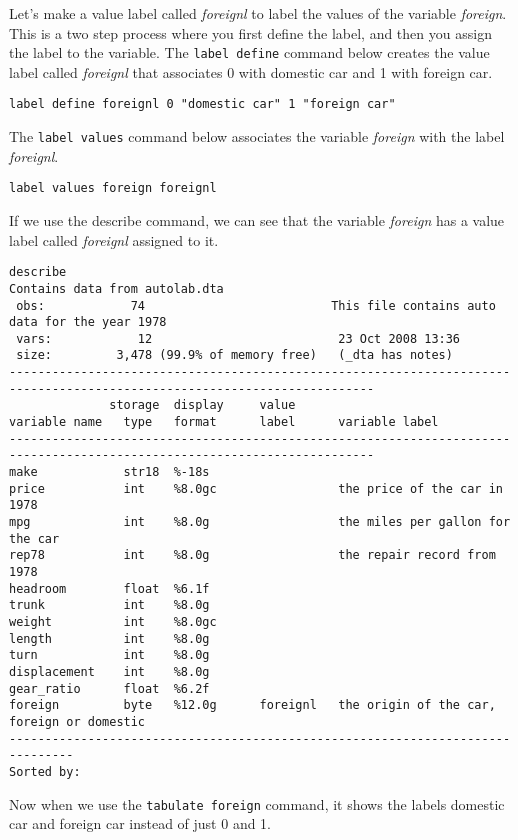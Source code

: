 Let's make a value label called \textit{foreignl} to label the values of the variable \textit{foreign}. This is a two step process where you first define the label, and then you assign the label to the variable.  The \lstinline{label define} command below creates the value label called \textit{foreignl} that associates 0 with domestic car and 1 with foreign car.

\begin{lstlisting}
label define foreignl 0 "domestic car" 1 "foreign car"
\end{lstlisting}

The \lstinline{label values} command below associates the variable \textit{foreign} with the label \textit{foreignl}.

\begin{lstlisting}
label values foreign foreignl
\end{lstlisting}

If we use the describe command, we can see that the variable \textit{foreign} has a value label called \textit{foreignl} assigned to it.

\begin{lstlisting}
describe
Contains data from autolab.dta
 obs:            74                          This file contains auto data for the year 1978
 vars:            12                          23 Oct 2008 13:36
 size:         3,478 (99.9% of memory free)   (_dta has notes)
-------------------------------------------------------------------------------------------------------------------------
              storage  display     value
variable name   type   format      label      variable label
-------------------------------------------------------------------------------------------------------------------------
make            str18  %-18s
price           int    %8.0gc                 the price of the car in 1978
mpg             int    %8.0g                  the miles per gallon for the car
rep78           int    %8.0g                  the repair record from 1978
headroom        float  %6.1f
trunk           int    %8.0g
weight          int    %8.0gc
length          int    %8.0g
turn            int    %8.0g
displacement    int    %8.0g
gear_ratio      float  %6.2f
foreign         byte   %12.0g      foreignl   the origin of the car, foreign or domestic
-------------------------------------------------------------------------------
Sorted by:
\end{lstlisting}

Now when we use the \lstinline{tabulate foreign} command, it shows the labels domestic car and foreign car instead of just 0 and 1.

